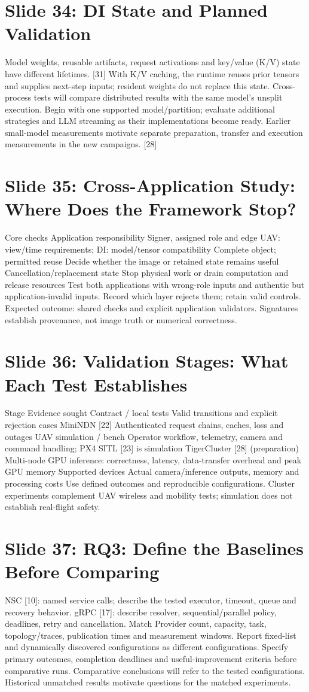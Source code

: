 \documentclass[11pt]{article}
\newcommand{\slideentry}[3]{\section*{Slide #1: #2}#3\par}
\begin{document}
\slideentry{34}{DI State and Planned Validation}{
Model weights, reusable artifacts, request activations and key/value (K/V) state have different lifetimes. [31] With K/V caching, the runtime reuses prior tensors and supplies next-step inputs; resident weights do not replace this state. Cross-process tests will compare distributed results with the same model’s unsplit execution. Begin with one supported model/partition; evaluate additional strategies and LLM streaming as their implementations become ready. Earlier small-model measurements motivate separate preparation, transfer and execution measurements in the new campaigns. [28]
}
\slideentry{35}{Cross-Application Study: Where Does the Framework Stop?}{
Core checks Application responsibility Signer, assigned role and edge UAV: view/time requirements; DI: model/tensor compatibility Complete object; permitted reuse Decide whether the image or retained state remains useful Cancellation/replacement state Stop physical work or drain computation and release resources Test both applications with wrong-role inputs and authentic but application-invalid inputs. Record which layer rejects them; retain valid controls. Expected outcome: shared checks and explicit application validators. Signatures establish provenance, not image truth or numerical correctness.
}
\slideentry{36}{Validation Stages: What Each Test Establishes}{
Stage Evidence sought Contract / local tests Valid transitions and explicit rejection cases MiniNDN [22] Authenticated request chains, caches, loss and outages UAV simulation / bench Operator workflow, telemetry, camera and command handling; PX4 SITL [23] is simulation TigerCluster [28] (preparation) Multi-node GPU inference: correctness, latency, data-transfer overhead and peak GPU memory Supported devices Actual camera/inference outputs, memory and processing costs Use defined outcomes and reproducible configurations. Cluster experiments complement UAV wireless and mobility tests; simulation does not establish real-flight safety.
}
\slideentry{37}{RQ3: Define the Baselines Before Comparing}{
NSC [10]: named service calls; describe the tested executor, timeout, queue and recovery behavior. gRPC [17]: describe resolver, sequential/parallel policy, deadlines, retry and cancellation. Match Provider count, capacity, task, topology/traces, publication times and measurement windows. Report fixed-list and dynamically discovered configurations as different configurations. Specify primary outcomes, completion deadlines and useful-improvement criteria before comparative runs. Comparative conclusions will refer to the tested configurations. Historical unmatched results motivate questions for the matched experiments.
}
\end{document}
